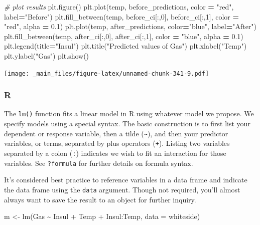 \documentclass[
]{book}
\newenvironment{Shaded}{\begin{snugshade}}{\end{snugshade}}
\newcommand{\AttributeTok}[1]{\textcolor[rgb]{0.77,0.63,0.00}{#1}}
\newcommand{\CommentTok}[1]{\textcolor[rgb]{0.56,0.35,0.01}{\textit{#1}}}
\newcommand{\DecValTok}[1]{\textcolor[rgb]{0.00,0.00,0.81}{#1}}
\newcommand{\FloatTok}[1]{\textcolor[rgb]{0.00,0.00,0.81}{#1}}
\newcommand{\FunctionTok}[1]{\textcolor[rgb]{0.00,0.00,0.00}{#1}}
\newcommand{\NormalTok}[1]{#1}
\newcommand{\OperatorTok}[1]{\textcolor[rgb]{0.81,0.36,0.00}{\textbf{#1}}}
\newcommand{\OtherTok}[1]{\textcolor[rgb]{0.56,0.35,0.01}{#1}}
\newcommand{\SpecialCharTok}[1]{\textcolor[rgb]{0.00,0.00,0.00}{#1}}
\newcommand{\StringTok}[1]{\textcolor[rgb]{0.31,0.60,0.02}{#1}}
\begin{document}
\begin{Shaded}
\begin{Highlighting}[]
\CommentTok{\# plot results}
\NormalTok{plt.figure()}
\NormalTok{plt.plot(temp, before\_predictions, color }\OperatorTok{=} \StringTok{"red"}\NormalTok{, label}\OperatorTok{=}\StringTok{"Before"}\NormalTok{)}
\NormalTok{plt.fill\_between(temp, before\_ci[:,}\DecValTok{0}\NormalTok{], before\_ci[:,}\DecValTok{1}\NormalTok{], color }\OperatorTok{=} \StringTok{"red"}\NormalTok{, alpha }\OperatorTok{=} \FloatTok{0.1}\NormalTok{)}
\NormalTok{plt.plot(temp, after\_predictions, color}\OperatorTok{=}\StringTok{"blue"}\NormalTok{, label}\OperatorTok{=}\StringTok{"After"}\NormalTok{)}
\NormalTok{plt.fill\_between(temp, after\_ci[:,}\DecValTok{0}\NormalTok{], after\_ci[:,}\DecValTok{1}\NormalTok{], color }\OperatorTok{=} \StringTok{"blue"}\NormalTok{, alpha }\OperatorTok{=} \FloatTok{0.1}\NormalTok{)}
\NormalTok{plt.legend(title}\OperatorTok{=}\StringTok{"Insul"}\NormalTok{)}
\NormalTok{plt.title(}\StringTok{"Predicted values of Gas"}\NormalTok{)}
\NormalTok{plt.xlabel(}\StringTok{"Temp"}\NormalTok{)}
\NormalTok{plt.ylabel(}\StringTok{"Gas"}\NormalTok{)}
\NormalTok{plt.show()}
\end{Highlighting}
\end{Shaded}

\texttt{[image: \_main\_files/figure-latex/unnamed-chunk-341-9.pdf]}

\hypertarget{r-49}{%
\subsubsection*{R}\label{r-49}}

The \texttt{lm()} function fits a linear model in R using whatever model we propose. We specify models using a special syntax. The basic construction is to first list your dependent or response variable, then a tilde (\texttt{\textasciitilde{}}), and then your predictor variables, or terms, separated by plus operators (\texttt{+}). Listing two variables separated by a colon (\texttt{:}) indicates we wish to fit an interaction for those variables. See \texttt{?formula} for further details on formula syntax.

It's considered best practice to reference variables in a data frame and indicate the data frame using the \texttt{data} argument. Though not required, you'll almost always want to save the result to an object for further inquiry.

\begin{Shaded}
\begin{Highlighting}[]
\NormalTok{m }\OtherTok{\textless{}{-}} \FunctionTok{lm}\NormalTok{(Gas }\SpecialCharTok{\textasciitilde{}}\NormalTok{ Insul }\SpecialCharTok{+}\NormalTok{ Temp }\SpecialCharTok{+}\NormalTok{ Insul}\SpecialCharTok{:}\NormalTok{Temp, }\AttributeTok{data =}\NormalTok{ whiteside)}
\end{Highlighting}
\end{Shaded}
\end{document}

